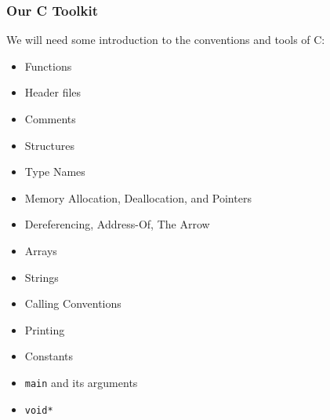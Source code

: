 \begin{frame}
\frametitle{Our C Toolkit}

We will need some introduction to the conventions and tools of C:
\begin{itemize}
	\item Functions
	\item Header files
	\item Comments
	\item Structures
	\item Type Names
	\item Memory Allocation, Deallocation, and Pointers
	\item Dereferencing, Address-Of, The Arrow
	\item Arrays
	\item Strings
	\item Calling Conventions
	\item Printing
	\item Constants
	\item \texttt{main} and its arguments
	\item \texttt{void*}
\end{itemize}


\end{frame}






